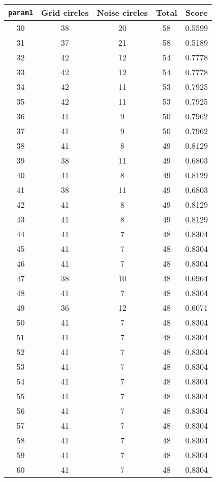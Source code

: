 \documentclass[letterpaper, 12pt]{article}
\begin{document}
\begin{longtable}{|c|c|c|c|c|}
\hline
\textbf{\texttt{param1}} & \textbf{Grid circles} & \textbf{Noise circles} & \textbf{Total} & \textbf{Score} \\
\hline
30 & 38 & 20 & 58 & 0.5599 \\
\hline
31 & 37 & 21 & 58 & 0.5189 \\
\hline
32 & 42 & 12 & 54 & 0.7778 \\
\hline
33 & 42 & 12 & 54 & 0.7778 \\
\hline
34 & 42 & 11 & 53 & 0.7925 \\
\hline
35 & 42 & 11 & 53 & 0.7925 \\
\hline
36 & 41 & 9 & 50 & 0.7962 \\
\hline
37 & 41 & 9 & 50 & 0.7962 \\
\hline
38 & 41 & 8 & 49 & 0.8129 \\
\hline
39 & 38 & 11 & 49 & 0.6803 \\
\hline
40 & 41 & 8 & 49 & 0.8129 \\
\hline
41 & 38 & 11 & 49 & 0.6803 \\
\hline
42 & 41 & 8 & 49 & 0.8129 \\
\hline
43 & 41 & 8 & 49 & 0.8129 \\
\hline
44 & 41 & 7 & 48 & 0.8304 \\
\hline
45 & 41 & 7 & 48 & 0.8304 \\
\hline
46 & 41 & 7 & 48 & 0.8304 \\
\hline
47 & 38 & 10 & 48 & 0.6964 \\
\hline
48 & 41 & 7 & 48 & 0.8304 \\
\hline
49 & 36 & 12 & 48 & 0.6071 \\
\hline
50 & 41 & 7 & 48 & 0.8304 \\
\hline
51 & 41 & 7 & 48 & 0.8304 \\
\hline
52 & 41 & 7 & 48 & 0.8304 \\
\hline
53 & 41 & 7 & 48 & 0.8304 \\
\hline
54 & 41 & 7 & 48 & 0.8304 \\
\hline
55 & 41 & 7 & 48 & 0.8304 \\
\hline
56 & 41 & 7 & 48 & 0.8304 \\
\hline
57 & 41 & 7 & 48 & 0.8304 \\
\hline
58 & 41 & 7 & 48 & 0.8304 \\
\hline
59 & 41 & 7 & 48 & 0.8304 \\
\hline
60 & 41 & 7 & 48 & 0.8304 \\
\hline

\end{longtable}
\end{document}
